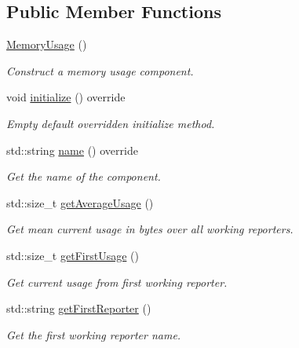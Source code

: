 \subsection*{Public Member Functions}
\begin{DoxyCompactItemize}
\item 
\hyperlink{structvt_1_1util_1_1memory_1_1_memory_usage_a5838280c7b2b24ab8ed2aff450b5e98f}{Memory\+Usage} ()
\begin{DoxyCompactList}\small\item\em Construct a memory usage component. \end{DoxyCompactList}\item 
void \hyperlink{structvt_1_1util_1_1memory_1_1_memory_usage_add66c6cdabed24194310380c5a28951a}{initialize} () override
\begin{DoxyCompactList}\small\item\em Empty default overridden initialize method. \end{DoxyCompactList}\item 
std\+::string \hyperlink{structvt_1_1util_1_1memory_1_1_memory_usage_abd58d8e05874fa3da64e15fef0b9e87f}{name} () override
\begin{DoxyCompactList}\small\item\em Get the name of the component. \end{DoxyCompactList}\item 
std\+::size\+\_\+t \hyperlink{structvt_1_1util_1_1memory_1_1_memory_usage_a59d87ec931fe37d4300ba72b00e63d8e}{get\+Average\+Usage} ()
\begin{DoxyCompactList}\small\item\em Get mean current usage in bytes over all working reporters. \end{DoxyCompactList}\item 
std\+::size\+\_\+t \hyperlink{structvt_1_1util_1_1memory_1_1_memory_usage_ab02282aab80eb52e5f8f43095af05304}{get\+First\+Usage} ()
\begin{DoxyCompactList}\small\item\em Get current usage from first working reporter. \end{DoxyCompactList}\item 
std\+::string \hyperlink{structvt_1_1util_1_1memory_1_1_memory_usage_a5baf0fd6bf753755c4602fcb91a7c268}{get\+First\+Reporter} ()
\begin{DoxyCompactList}\small\item\em Get the first working reporter name. \end{DoxyCompactList}\item 

\end{DoxyCompactItemize}
